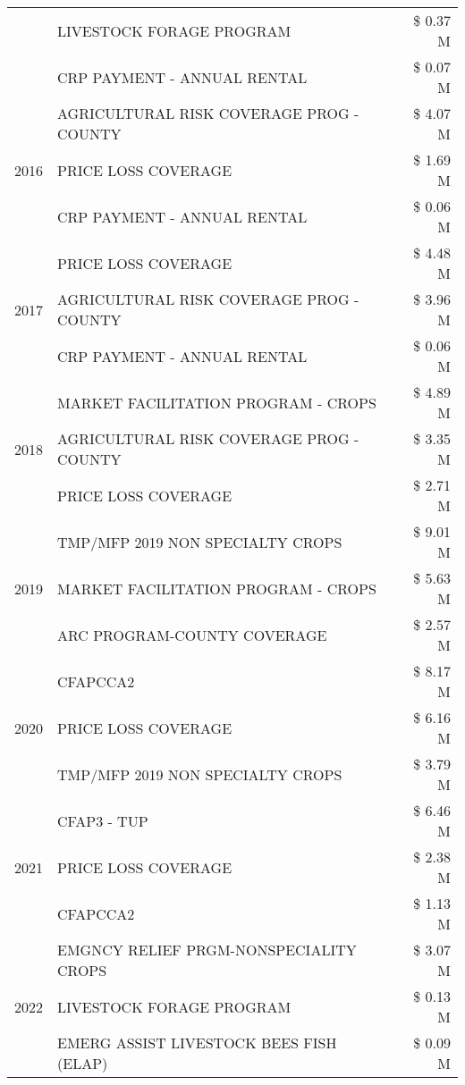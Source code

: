 \begin{tabular}{llr}
 & LIVESTOCK FORAGE PROGRAM & \$ 0.37 M \\
 & CRP PAYMENT - ANNUAL RENTAL & \$ 0.07 M \\
\cline{1-3}
\multirow[t]{3}{*}{2016} & AGRICULTURAL RISK COVERAGE PROG - COUNTY & \$ 4.07 M \\
 & PRICE LOSS COVERAGE & \$ 1.69 M \\
 & CRP PAYMENT - ANNUAL RENTAL & \$ 0.06 M \\
\cline{1-3}
\multirow[t]{3}{*}{2017} & PRICE LOSS COVERAGE & \$ 4.48 M \\
 & AGRICULTURAL RISK COVERAGE PROG - COUNTY & \$ 3.96 M \\
 & CRP PAYMENT - ANNUAL RENTAL & \$ 0.06 M \\
\cline{1-3}
\multirow[t]{3}{*}{2018} & MARKET FACILITATION PROGRAM - CROPS & \$ 4.89 M \\
 & AGRICULTURAL RISK COVERAGE PROG - COUNTY & \$ 3.35 M \\
 & PRICE LOSS COVERAGE & \$ 2.71 M \\
\cline{1-3}
\multirow[t]{3}{*}{2019} & TMP/MFP 2019 NON SPECIALTY CROPS & \$ 9.01 M \\
 & MARKET FACILITATION PROGRAM - CROPS & \$ 5.63 M \\
 & ARC PROGRAM-COUNTY COVERAGE & \$ 2.57 M \\
\cline{1-3}
\multirow[t]{3}{*}{2020} & CFAPCCA2 & \$ 8.17 M \\
 & PRICE LOSS COVERAGE & \$ 6.16 M \\
 & TMP/MFP 2019 NON SPECIALTY CROPS & \$ 3.79 M \\
\cline{1-3}
\multirow[t]{3}{*}{2021} & CFAP3 - TUP & \$ 6.46 M \\
 & PRICE LOSS COVERAGE & \$ 2.38 M \\
 & CFAPCCA2 & \$ 1.13 M \\
\cline{1-3}
\multirow[t]{3}{*}{2022} & EMGNCY RELIEF PRGM-NONSPECIALITY CROPS & \$ 3.07 M \\
 & LIVESTOCK FORAGE PROGRAM & \$ 0.13 M \\
 & EMERG ASSIST LIVESTOCK BEES FISH (ELAP) & \$ 0.09 M \\
\cline{1-3}
\bottomrule
\end{tabular}
